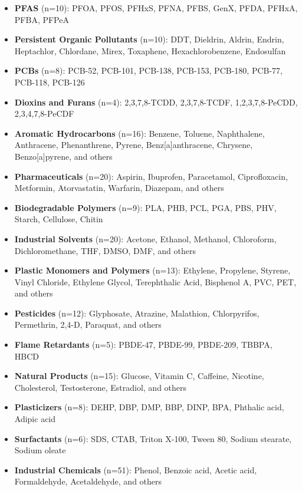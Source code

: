 \documentclass[11pt,letterpaper]{article}
\begin{document}
\begin{itemize}
    \item \textbf{PFAS} (n=10): PFOA, PFOS, PFHxS, PFNA, PFBS, GenX, PFDA, PFHxA, PFBA, PFPeA
    \item \textbf{Persistent Organic Pollutants} (n=10): DDT, Dieldrin, Aldrin, Endrin, Heptachlor, Chlordane, Mirex, Toxaphene, Hexachlorobenzene, Endosulfan
    \item \textbf{PCBs} (n=8): PCB-52, PCB-101, PCB-138, PCB-153, PCB-180, PCB-77, PCB-118, PCB-126
    \item \textbf{Dioxins and Furans} (n=4): 2,3,7,8-TCDD, 2,3,7,8-TCDF, 1,2,3,7,8-PeCDD, 2,3,4,7,8-PeCDF
    \item \textbf{Aromatic Hydrocarbons} (n=16): Benzene, Toluene, Naphthalene, Anthracene, Phenanthrene, Pyrene, Benz[a]anthracene, Chrysene, Benzo[a]pyrene, and others
    \item \textbf{Pharmaceuticals} (n=20): Aspirin, Ibuprofen, Paracetamol, Ciprofloxacin, Metformin, Atorvastatin, Warfarin, Diazepam, and others
    \item \textbf{Biodegradable Polymers} (n=9): PLA, PHB, PCL, PGA, PBS, PHV, Starch, Cellulose, Chitin
    \item \textbf{Industrial Solvents} (n=20): Acetone, Ethanol, Methanol, Chloroform, Dichloromethane, THF, DMSO, DMF, and others
    \item \textbf{Plastic Monomers and Polymers} (n=13): Ethylene, Propylene, Styrene, Vinyl Chloride, Ethylene Glycol, Terephthalic Acid, Bisphenol A, PVC, PET, and others
    \item \textbf{Pesticides} (n=12): Glyphosate, Atrazine, Malathion, Chlorpyrifos, Permethrin, 2,4-D, Paraquat, and others
    \item \textbf{Flame Retardants} (n=5): PBDE-47, PBDE-99, PBDE-209, TBBPA, HBCD
    \item \textbf{Natural Products} (n=15): Glucose, Vitamin C, Caffeine, Nicotine, Cholesterol, Testosterone, Estradiol, and others
    \item \textbf{Plasticizers} (n=8): DEHP, DBP, DMP, BBP, DINP, BPA, Phthalic acid, Adipic acid
    \item \textbf{Surfactants} (n=6): SDS, CTAB, Triton X-100, Tween 80, Sodium stearate, Sodium oleate
    \item \textbf{Industrial Chemicals} (n=51): Phenol, Benzoic acid, Acetic acid, Formaldehyde, Acetaldehyde, and others
\end{itemize}
\end{document}
